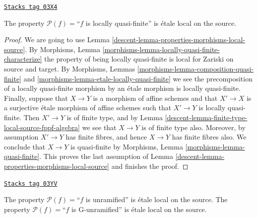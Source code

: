 \begin{lemma}
\label{descent-lemma-locally-quasi-finite-etale-local-source}
\href{https://stacks.math.columbia.edu/tag/03X4}{\texttt{Stacks tag 03X4}}

The property $\mathcal{P}(f)=$``$f$ is locally quasi-finite''
is \'etale local on the source.
\end{lemma}

\begin{proof}

We are going to use
Lemma \ref{descent-lemma-properties-morphisms-local-source}.
By
Morphisms, Lemma
\ref{morphisms-lemma-locally-quasi-finite-characterize}
the property of being locally quasi-finite is local for Zariski on source
and target. By
Morphisms, Lemmas
\ref{morphisms-lemma-composition-quasi-finite} and
\ref{morphisms-lemma-etale-locally-quasi-finite}
we see the precomposition
of a locally quasi-finite morphism by an \'etale morphism is locally
quasi-finite. Finally, suppose that $X \to Y$ is a morphism of affine schemes
and that $X' \to X$ is a surjective \'etale morphism of affine schemes
such that $X' \to Y$ is locally quasi-finite. Then $X' \to Y$ is of finite
type, and by
Lemma \ref{descent-lemma-finite-type-local-source-fppf-algebra}
we see that $X \to Y$ is of finite type also.
Moreover, by assumption $X' \to Y$ has finite fibres, and hence $X \to Y$
has finite fibres also. We conclude that $X \to Y$ is quasi-finite by
Morphisms, Lemma \ref{morphisms-lemma-quasi-finite}.
This proves the last assumption of
Lemma \ref{descent-lemma-properties-morphisms-local-source}
and finishes the proof.
\end{proof}

\begin{lemma}
\label{descent-lemma-unramified-etale-local-source}
\href{https://stacks.math.columbia.edu/tag/03YV}{\texttt{Stacks tag 03YV}}

The property $\mathcal{P}(f)=$``$f$ is unramified''
is \'etale local on the source.
The property $\mathcal{P}(f)=$``$f$ is G-unramified''
is \'etale local on the source.
\end{lemma}

